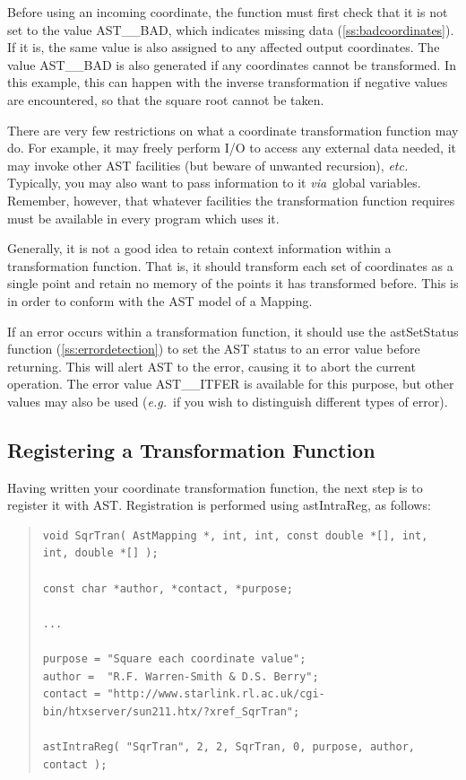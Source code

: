 \documentclass[twoside,11pt]{article}
\newcommand{\htmlref}[2]{#1}
\newcommand{\secref}[1]{\S\ref{#1}}
\renewcommand{\secref}[1]{\ref{#1}}
\begin{document}
Before using an incoming coordinate, the function must first check
that it is not set to the value AST\_\_BAD, which indicates missing
data (\secref{ss:badcoordinates}). If it is, the same value is also
assigned to any affected output coordinates. The value AST\_\_BAD is
also generated if any coordinates cannot be transformed. In this
example, this can happen with the inverse transformation if negative
values are encountered, so that the square root cannot be taken.

There are very few restrictions on what a coordinate transformation
function may do. For example, it may freely perform I/O to access any
external data needed, it may invoke other AST facilities (but beware
of unwanted recursion), {\em{etc.}} Typically, you may also want to
pass information to it {\em{via}}\ global variables. Remember,
however, that whatever facilities the transformation function requires
must be available in every program which uses it.

Generally, it is not a good idea to retain context information within
a transformation function. That is, it should transform each set of
coordinates as a single point and retain no memory of the points it
has transformed before. This is in order to conform with the AST model
of a \htmlref{Mapping}{Mapping}.

If an error occurs within a transformation function, it should use the
\htmlref{astSetStatus}{astSetStatus} function (\secref{ss:errordetection}) to set the AST
status to an error value before returning. This will alert AST to the
error, causing it to abort the current operation. The error value
AST\_\_ITFER is available for this purpose, but other values may also
be used ({\em{e.g.}}\ if you wish to distinguish different types of
error).

\subsection{\label{ss:registeringintramaps}Registering a Transformation Function}

Having written your coordinate transformation function, the next step
is to register it with AST. Registration is performed using
\htmlref{astIntraReg}{astIntraReg}, as follows:

\begin{quote}
\small
\begin{verbatim}
void SqrTran( AstMapping *, int, int, const double *[], int, int, double *[] );

const char *author, *contact, *purpose;

...

purpose = "Square each coordinate value";
author =  "R.F. Warren-Smith & D.S. Berry";
contact = "http://www.starlink.rl.ac.uk/cgi-bin/htxserver/sun211.htx/?xref_SqrTran";

astIntraReg( "SqrTran", 2, 2, SqrTran, 0, purpose, author, contact );
\end{verbatim}
\normalsize
\end{quote}
\end{document}

